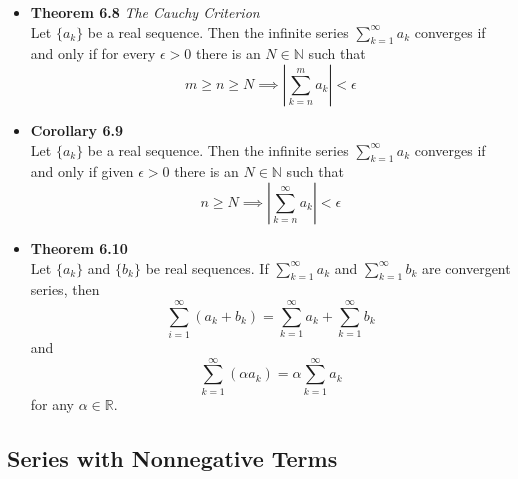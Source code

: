 \documentclass[11pt,a4paper]{article}
\begin{document}
\begin{itemize}
    \item \textbf{Theorem 6.8} \emph{The Cauchy Criterion} \\
        Let $\{a_k\}$ be a real sequence.
        Then the infinite series $\sum_{k=1}^\infty a_k$ converges if and only if for every
        $\epsilon > 0$ there is an $N \in \mathbb{N}$ such that
        \[
            m \geq n \geq N \implies \left| \sum_{k=n}^m a_k \right| < \epsilon
        \]

    \item \textbf{Corollary 6.9} \\
        Let $\{a_k\}$ be a real sequence.
        Then the infinite series $\sum_{k=1}^\infty a_k$ converges if and only if given
        $\epsilon > 0$ there is an $N \in \mathbb{N}$ such that
        \[
            n \geq N \implies \left| \sum_{k=n}^\infty a_k \right| < \epsilon
        \]

    \item \textbf{Theorem 6.10} \\
        Let $\{a_k\}$ and $\{b_k\}$ be real sequences.
        If $\sum_{k=1}^\infty a_k$ and $\sum_{k=1}^\infty b_k$ are convergent series, then
        \[
            \sum_{i=1}^\infty (a_k + b_k) = \sum_{k=1}^\infty a_k + \sum_{k=1}^\infty b_k
        \]
        and
        \[
            \sum_{k=1}^\infty (\alpha a_k) = \alpha \sum_{k=1}^\infty a_k
        \]
        for any $\alpha \in \mathbb{R}$.
\end{itemize}

\subsection{Series with Nonnegative Terms}
\end{document}

